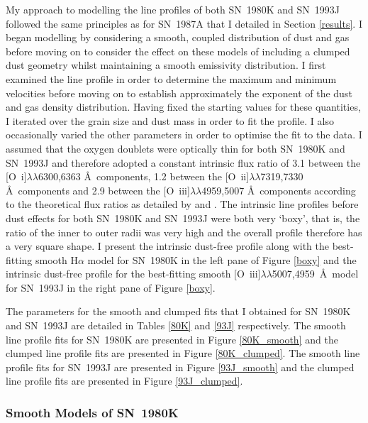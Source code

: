 My approach to modelling the line profiles of both SN~1980K and SN~1993J followed the same principles as for SN~1987A that I detailed in Section \ref{results}.  I began modelling by considering a smooth, coupled distribution of dust and gas before moving on to consider the effect on these models of including a clumped dust geometry whilst maintaining a smooth emissivity distribution.  I first examined the line profile in order to determine the maximum and minimum velocities before moving on to establish approximately the exponent of the dust and gas density distribution.  Having fixed the starting values for these quantities, I iterated over the grain size and dust mass in order to fit the profile.  I also occasionally  varied the other parameters in order to optimise the fit to the data. I assumed that the oxygen doublets were optically thin for both SN~1980K and SN~1993J and therefore adopted a constant intrinsic flux ratio of 3.1 between the [O~{\sc i}]$\lambda\lambda$6300,6363 \AA\  components, 1.2 between the [O~{\sc ii}]$\lambda\lambda$7319,7330 \AA\  components and 2.9 between the [O~{\sc iii}]$\lambda\lambda$4959,5007 \AA\  components according to the theoretical flux ratios as detailed by \citet{Zeippen1987} and \citet{Storey2000}.  The intrinsic line profiles before dust effects for both SN~1980K and SN~1993J were both very `boxy', that is, the ratio of the inner to outer radii was very high and the overall profile therefore has a very square shape.  I present the intrinsic dust-free profile along with the best-fitting smooth H$\alpha$ model for SN~1980K in the left pane of Figure \ref{boxy} and the intrinsic dust-free profile for the best-fitting smooth [O~{\sc iii}]$\lambda\lambda$5007,4959~\AA\ model for SN~1993J in the right pane of Figure \ref{boxy}.


The parameters for the smooth and clumped fits  that I obtained for SN~1980K and SN~1993J are detailed in Tables \ref{80K} and \ref{93J} respectively. The smooth line profile fits for SN~1980K are presented in Figure \ref{80K_smooth} and the clumped line profile fits are presented in Figure \ref{80K_clumped}.  The smooth line profile fits for SN~1993J are presented in Figure \ref{93J_smooth} and the clumped line profile fits are presented in Figure \ref{93J_clumped}.  

\subsubsection{Smooth Models of SN~1980K}

